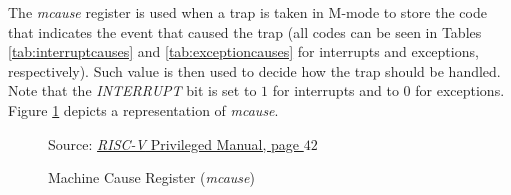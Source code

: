 The \textit{mcause} register is used when a trap is taken in M-mode to store the
code that indicates the event that caused the trap (all codes can be seen in Tables
\ref{tab:interruptcauses} and \ref{tab:exceptioncauses} for interrupts and exceptions,
respectively). Such value is then used to decide how the trap should be handled.
Note that the \textit{INTERRUPT} bit is set to $1$ for interrupts and to $0$ for
exceptions. Figure \ref{fig:mcause} depicts a representation of \textit{mcause}.
\\
\begin{figure}[H]
  \centering
  \def\stackalignment{r} %
  {\scriptsize Source: \href{https://drive.google.com/file/d/17GeetSnT5wW3xNuAHI95-SI1gPGd5sJ_/view}{\textit{RISC-V} Privileged Manual, page $42$}}
  \caption{Machine Cause Register (\textit{mcause})}
  \label{fig:mcause}
\end{figure}

